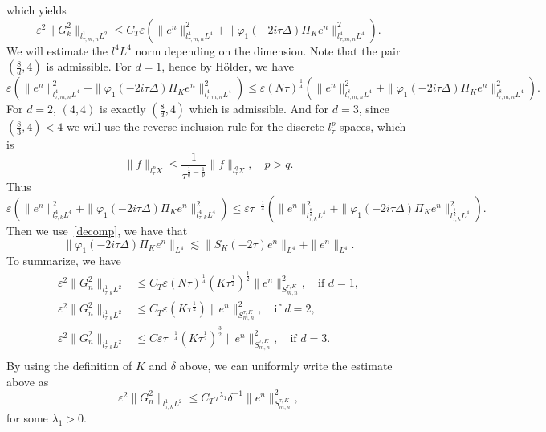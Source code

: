 \documentclass[10pt,a4paper]{article}
\begin{document}
  which yields 
  \[ \varepsilon^2\|G_k^2\|_{l^1_{\tau,m,n}L^2} \leq  C_T \varepsilon
  \left(\|e^n\|^2_{l^4_{\tau,m,n}L^4} + \|\varphi_1(-2i\tau\Delta)\Pi_K e^n\|^2_{l^4_{\tau,m,n}L^4} \right).
  \]
  We will estimate the \(l^4L^4\) norm depending on the dimension. Note that the pair 
  \((\frac8d,4)\) is admissible. For \(d=1\), hence by H\"older, we have 
  \begin{equation*}
      \varepsilon \left(\|e^n\|^2_{l^4_{\tau,m,n}L^4} + \|\varphi_1(-2i\tau\Delta)\Pi_K e^n\|^2_{l^4_{\tau,m,n}L^4} \right)
      \leq \varepsilon (N\tau)^{\frac14} \left(\|e^n\|^2_{l^8_{\tau,m,n}L^4} 
      + \|\varphi_1(-2i\tau\Delta)\Pi_K e^n\|^2_{l^8_{\tau,m,n}L^4} \right).
  \end{equation*}
  For \(d=2\), \((4,4)\) is exactly \((\frac8d,4)\) which is admissible. And for
  \(d=3\), since \((\frac83,4) < 4\) we will use the reverse inclusion rule for
  the discrete \(l^p_\tau\) spaces, which is 
  \[ \|f\|_{l^p_\tau X} \leq \frac1{\tau^{\frac1q-\frac1p}} \|f\|_{l^q_\tau X}, 
  \quad p > q.\]
  Thus 
  \[ \varepsilon \left(\|e^n\|^2_{l^4_{\tau,k}L^4} + \|\varphi_1(-2i\tau\Delta)\Pi_K e^n\|^2_{l^4_{\tau,k}L^4} \right)
  \leq \varepsilon \tau^{-\frac14} \left(\|e^n\|^2_{l^\frac8d_{\tau,k}L^4} + 
  \|\varphi_1(-2i\tau\Delta)\Pi_K e^n\|^2_{l^\frac8d_{\tau,k}L^4}\right). \]
  Then we use~\eqref{decomp}, we have that 
  \begin{equation*}\label{phie}
    \|\varphi_1(-2i\tau\Delta)\Pi_K e^n\|_{L^4} 
    \lesssim \|S_K(-2\tau)e^n\|_{L^4} + 
    \|e^n\|_{L^4}.
  \end{equation*}
  To summarize, we have 
  \begin{equation*}
    \begin{aligned}
      \varepsilon^2\|G_n^2\|_{l^1_{\tau,k}L^2} &\leq C_T \varepsilon (N\tau)^\frac14 (K\tau^\frac12)^\frac12
      \|e^n\|_{S^{\tau,K}_{m,n}}^2,\quad \text{if }d=1,\\
      \varepsilon^2\|G_n^2\|_{l^1_{\tau,k}L^2} &\leq C_T \varepsilon (K\tau^\frac12)
      \|e^n\|_{S^{\tau,K}_{m,n}}^2,\quad \text{if }d=2,\\
      \varepsilon^2\|G_n^2\|_{l^1_{\tau,k}L^2} &\leq C \varepsilon \tau^{-\frac14} (K\tau^\frac12)^\frac32
      \|e^n\|_{S^{\tau,K}_{m,n}}^2,\quad \text{if }d=3.\\
    \end{aligned}
  \end{equation*}
  By using the definition of \(K\) and \(\delta\) above, we can uniformly write
  the estimate above as 
  \begin{equation}\label{G2}
    \varepsilon^2\|G_n^2\|_{l^1_{\tau,k}L^2} \leq C_T \tau^{\lambda_1}
    \delta^{-1} \|e^n\|_{S^{\tau,K}_{m,n}}^2,
  \end{equation}
  for some \(\lambda_1 > 0\).
\end{document}
